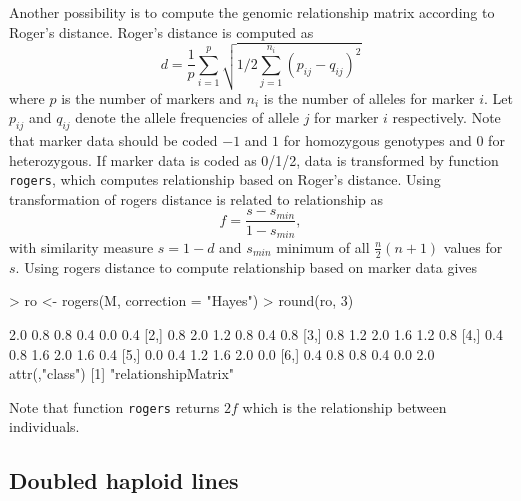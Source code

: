 \documentclass[a4paper,11pt]{article}
\begin{document}
Another possibility is to compute the genomic relationship matrix according to Roger's distance. Roger's distance is computed as 
\begin{equation}
d=\frac{1}{p}\sum_{i=1}^p \sqrt{1/2 \sum_{j=1}^{n_i}(p_{ij}-q_{ij})^2}
\end{equation}
where $p$ is the number of markers and $n_i$ is the number of alleles for marker $i$. Let $p_{ij}$ and $q_{ij}$ denote the allele frequencies of allele $j$ for marker $i$ respectively. Note that marker data should be coded $-1$ and $1$ for homozygous genotypes and 0 for heterozygous. If marker data is coded as 0/1/2, data is transformed by function \texttt{rogers}, which computes relationship based on Roger's distance. Using transformation of \citet{Hayes2008} rogers distance is related to relationship as
$$ f=\frac{s-s_{min}}{1-s_{min}}, $$
with similarity measure $s=1-d$ and $s_{min}$ minimum of all $\frac{n}{2}(n+1)$ values for $s$. Using rogers distance to compute relationship based on marker data gives
\begin{Schunk}
\begin{Sinput}
> ro <- rogers(M, correction = "Hayes")
> round(ro, 3)
\end{Sinput}
\begin{Soutput}
     [,1] [,2] [,3] [,4] [,5] [,6]
[1,]  2.0  0.8  0.8  0.4  0.0  0.4
[2,]  0.8  2.0  1.2  0.8  0.4  0.8
[3,]  0.8  1.2  2.0  1.6  1.2  0.8
[4,]  0.4  0.8  1.6  2.0  1.6  0.4
[5,]  0.0  0.4  1.2  1.6  2.0  0.0
[6,]  0.4  0.8  0.8  0.4  0.0  2.0
attr(,"class")
[1] "relationshipMatrix"
\end{Soutput}
\end{Schunk}
Note that function \texttt{rogers} returns $2f$ which is the relationship between individuals.


\subsection{Doubled haploid lines}
\end{document}
